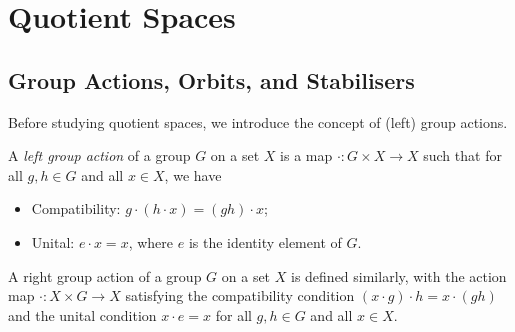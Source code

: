 \section{Quotient Spaces}

\subsection{Group Actions, Orbits, and Stabilisers}
Before studying quotient spaces, we introduce the concept of (left) group actions.

\begin{definition}\label{def:group_action}
  A \emph{left group action} of a group $G$ on a set $X$ is a map $\cdot \colon G \times X \to X$ such that for all $g, h \in G$ and all $x \in X$, we have
  \begin{itemize}
    \item Compatibility: $g \cdot (h \cdot x) = (gh) \cdot x$;
    \item Unital: $e \cdot x = x$, where $e$ is the identity element of $G$.
  \end{itemize}
\end{definition}

\begin{remark}
  A right group action of a group $G$ on a set $X$ is defined similarly, with the action map $\cdot \colon X \times G \to X$ satisfying the compatibility condition $ (x \cdot g) \cdot h = x \cdot (gh)$ and the unital condition $x \cdot e = x$ for all $g, h \in G$ and all $x \in X$.
\end{remark}

